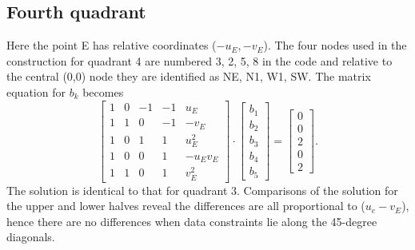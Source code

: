 \documentclass[12pt,letterpaper,margin=0.5in]{report}
\begin{document}
\subsection{Fourth quadrant}
Here the point E has relative coordinates ($-u_E, -v_E$).  The four nodes used in the
construction for quadrant 4 are numbered 3, 2, 5, 8 in the code and relative to the central (0,0) node they
are identified as NE, N1, W1, SW. The matrix equation for $b_k$ becomes
\begin{equation}
\left[ {\begin{array}{*{20}{r}}
1&0&{ - 1}&{ - 1}&{{u_E}}\\
1&1&0&{ - 1}&{ - {v_E}}\\
1&0&1&1&{u_E^2}\\
1&0&0&1&{ - {u_E}{v_E}}\\
1&1&0&1&{v_E^2}
\end{array}} \right] \cdot \left[ {\begin{array}{*{20}{c}}
{{b_1}}\\
{{b_2}}\\
{{b_3}}\\
{{b_4}}\\
{{b_5}}
\end{array}} \right] = \left[ {\begin{array}{*{20}{c}}
0\\
0\\
2\\
0\\
2
\end{array}} \right].
\end{equation}
The solution is identical to that for quadrant 3.
Comparisons of the solution for the upper and lower halves reveal the differences are all proportional to
($u_e - v_E$), hence there are no differences when data constraints lie along the 45-degree diagonals.
\end{document}

